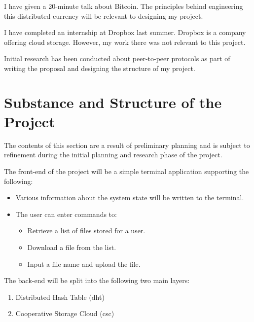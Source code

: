\documentclass[12pt]{article}
\begin{document}
I have given a 20-minute talk about Bitcoin. The principles behind engineering this distributed currency will be relevant to designing my project.

I have completed an internship at Dropbox last summer. Dropbox is a company offering cloud storage. However, my work there was not relevant to this project.

Initial research has been conducted about peer-to-peer protocols as part of writing the proposal and designing the structure of my project.

\section{Substance and Structure of the Project}

The contents of this section are a result of preliminary planning and is subject to refinement during the initial planning and research phase of the project.

The front-end of the project will be a simple terminal application supporting the following:

\begin{itemize}
\item{Various information about the system state will be written to the terminal.}
\item{The user can enter commands to:}
\begin{itemize}
	\item{Retrieve a list of files stored for a user.}
	\item{Download a file from the list.}
	\item{Input a file name and upload the file.}

\end{itemize}
\end{itemize}

The back-end will be split into the following two main layers:

\begin{enumerate}
\item{Distributed Hash Table (\gls{dht})}
\item{Cooperative Storage Cloud (\gls{csc})}
\end{enumerate}

\vspace{0.5cm}
\end{document}
